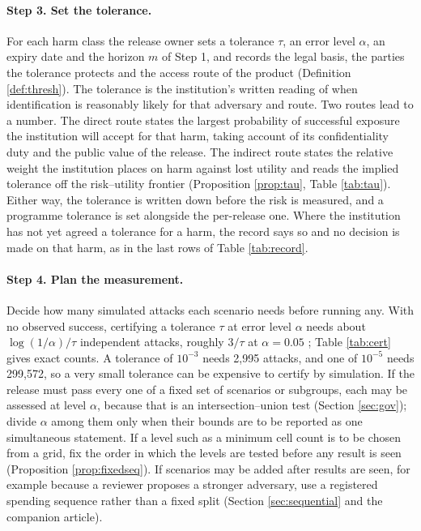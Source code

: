 \paragraph{Step 3. Set the tolerance.}
For each harm class the release owner sets a tolerance $\tau$, an error level
$\alpha$, an expiry date and the horizon $m$ of Step 1, and records the legal
basis, the parties the tolerance protects and the access route of the product
(Definition \ref{def:thresh}). The tolerance is the institution's written reading
of when identification is reasonably likely for that adversary and route. Two routes lead to a number. The direct route states the
largest probability of successful exposure the institution will accept for that
harm, taking account of its confidentiality duty and the public value of the
release. The indirect route states the relative weight the institution places on
harm against lost utility and reads the implied tolerance off the risk--utility
frontier (Proposition \ref{prop:tau}, Table \ref{tab:tau}). Either way, the
tolerance is written down before the risk is measured, and a programme tolerance
is set alongside the per-release one. Where the institution has not yet agreed a
tolerance for a harm, the record says so and no decision is made on that harm,
as in the last rows of Table \ref{tab:record}.

\paragraph{Step 4. Plan the measurement.}
Decide how many simulated attacks each scenario needs before running any. With no
observed success, certifying a tolerance $\tau$ at error level $\alpha$ needs
about $\log(1/\alpha)/\tau$ independent attacks, roughly $3/\tau$ at
$\alpha = 0.05$ \citep{hanley1983}; Table \ref{tab:cert} gives exact counts. A
tolerance of $10^{-3}$ needs 2{,}995 attacks, and one of $10^{-5}$ needs
299{,}572, so a very small tolerance can be expensive to certify by simulation.
If the release must pass every one of a fixed set of scenarios or subgroups, each
may be assessed at level $\alpha$, because that is an intersection--union test
(Section \ref{sec:gov}); divide $\alpha$ among them only when their bounds are to
be reported as one simultaneous statement. If a level such as a minimum cell
count is to be chosen from a grid, fix the order in which the levels are tested
before any result is seen (Proposition \ref{prop:fixedseq}). If scenarios may be added after results
are seen, for example because a reviewer proposes a stronger adversary, use a
registered spending sequence rather than a fixed split (Section
\ref{sec:sequential} and the companion article).


